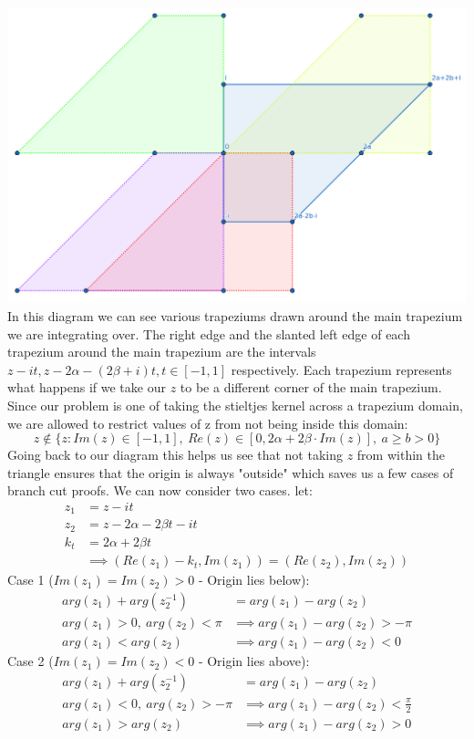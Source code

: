 \documentclass{article}
\begin{document}
\includegraphics[width=\textwidth]{z12}
In this diagram we can see various trapeziums drawn around the main trapezium we are integrating over.
The right edge and the slanted left edge of each trapezium around the main trapezium are the intervals $z-it,z-2\alpha-(2\beta+i)t,t\in[-1,1]$ respectively.
Each trapezium represents what happens if we take our $z$ to be a different corner of the main trapezium.
Since our problem is one of taking the stieltjes kernel across a trapezium domain, we are allowed to restrict values of z from not being inside this domain:
$$z\notin \{z: Im(z)\in [-1,1],\:Re(z)\in [0,2\alpha+2\beta\cdot Im(z)],\:a\geq b>0\}$$
Going back to our diagram this helps us see that not taking $z$ from within the triangle ensures that the origin is always "outside" which saves us a few cases of branch cut proofs.
We can now consider two cases.
let:
\begin{align}
    z_1&=z-it\\
    z_2&=z-2\alpha-2\beta t-it\\
    k_t&=2\alpha+2\beta t\\
    &\implies (Re(z_1)-k_t, Im(z_1))=(Re(z_2), Im(z_2))
\end{align}
Case 1 ($Im(z_1)=Im(z_2)>0$ - Origin lies below):
\begin{align}
    arg(z_1)+arg(z_2^{-1})&=arg(z_1)-arg(z_2)\\
    arg(z_1)>0,\:arg(z_2)<\pi&\implies arg(z_1)-arg(z_2)>-\pi\\
    arg(z_1)<arg(z_2)&\implies arg(z_1)-arg(z_2)<0
\end{align}
Case 2 ($Im(z_1)=Im(z_2)<0$ - Origin lies above):
\begin{align}
    arg(z_1)+arg(z_2^{-1})&=arg(z_1)-arg(z_2)\\
    arg(z_1)<0,\:arg(z_2)>-\pi&\implies arg(z_1)-arg(z_2)<\frac{\pi}{2}\\
    arg(z_1)>arg(z_2)&\implies arg(z_1)-arg(z_2)>0
\end{align}
\end{document}
